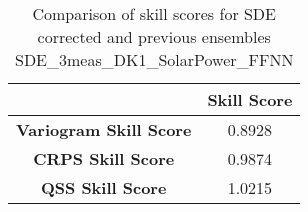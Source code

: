 
        \begin{table}[h!]
            \centering
            \begin{tabular}{|c|c|}
                \hline
                & \textbf{Skill Score}  \\
                \hline
                \textbf{Variogram Skill Score} & 0.8928  \\
                \hline
                \textbf{CRPS Skill Score} & 0.9874  \\
                \hline
                \textbf{QSS Skill Score} & 1.0215 \\
                \hline
            \end{tabular}
            \caption{Comparison of skill scores for SDE corrected and previous ensembles SDE_3meas_DK1_SolarPower_FFNN}
            \label{table:skill_scores_comparison}
        \end{table}
        